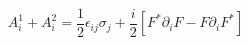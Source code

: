 \begin{equation}
\label{sumpot}
A^1_i+A^2_i=\frac{1}{2}\epsilon_{ij}\sigma_j+\frac{i}{2}[F^*\partial_iF-F\partial_iF^*]
\end{equation}

